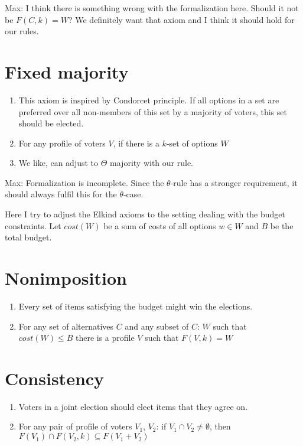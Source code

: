 \documentclass{article}
\begin{document}
Max: {I think there is something wrong with the formalization here. Should it not be $F(C,k)=W$? We definitely want that axiom and I think it should hold for our rules.}

\section{Fixed majority}
\begin{enumerate}
\item This axiom is inspired by Condorcet principle. If all options in a set are preferred over all non-members of this set by a majority of voters, this set should be elected.
\item For any profile of voters $V$, if there is a $k$-set of options $W$
\item We like, can adjust to $\Theta$ majority with our rule.

\end{enumerate}

Max: {Formalization is incomplete. Since the $\theta$-rule has a stronger requirement, it should always fulfil this for the $\theta$-case. }

Here I try to adjust the Elkind axioms to the setting dealing with the budget constraints. Let $cost(W)$ be a sum of costs of all options $w \in W$ and $B$ be the total budget.
\section{Nonimposition}
\begin{enumerate}
\item Every set of items satisfying the budget might win the elections.
\item For any set of alternatives $C$ and any subset of $C$: $W$ such that $cost(W) \leq B$ there is a profile $V$ such that $F(V, k)=W$
\end{enumerate}

\section{Consistency}
\begin{enumerate}
\item Voters in a joint election should elect items that they agree on.
\item For any pair of profile of voters $V_1$, $V_2$: if $V_1 \cap V_2 \neq \emptyset$, then $ F(V_1) \cap F(V_2, k) \subseteq F(V_1+V_2)$
\end{enumerate}
\end{document}
